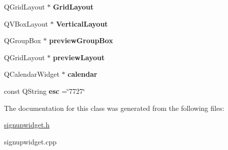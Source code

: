 \begin{DoxyCompactItemize}
\item 
\hypertarget{classSignUpWidget_a8cbab0787f691e50dad611971126eae0}{Q\-Grid\-Layout $\ast$ {\bfseries Grid\-Layout}}\label{classSignUpWidget_a8cbab0787f691e50dad611971126eae0}

\item 
\hypertarget{classSignUpWidget_ad88330f83eea902c6334a9a668cae698}{Q\-V\-Box\-Layout $\ast$ {\bfseries Vertical\-Layout}}\label{classSignUpWidget_ad88330f83eea902c6334a9a668cae698}

\item 
\hypertarget{classSignUpWidget_a565b3333be79f3851fdbbb03a59b6cdb}{Q\-Group\-Box $\ast$ {\bfseries preview\-Group\-Box}}\label{classSignUpWidget_a565b3333be79f3851fdbbb03a59b6cdb}

\item 
\hypertarget{classSignUpWidget_a809720773e0d5d303e0773f8626d1e1a}{Q\-Grid\-Layout $\ast$ {\bfseries preview\-Layout}}\label{classSignUpWidget_a809720773e0d5d303e0773f8626d1e1a}

\item 
\hypertarget{classSignUpWidget_a8284b30d58c68e442cbdbf814ef466e4}{Q\-Calendar\-Widget $\ast$ {\bfseries calendar}}\label{classSignUpWidget_a8284b30d58c68e442cbdbf814ef466e4}

\item 
\hypertarget{classSignUpWidget_a231bc2480defd545864f3330d0096127}{const Q\-String {\bfseries esc} =\char`\"{}7727\char`\"{}}\label{classSignUpWidget_a231bc2480defd545864f3330d0096127}

\end{DoxyCompactItemize}


The documentation for this class was generated from the following files\-:\begin{DoxyCompactItemize}
\item 
\hyperlink{signupwidget_8h}{signupwidget.\-h}\item 
signupwidget.\-cpp\end{DoxyCompactItemize}
